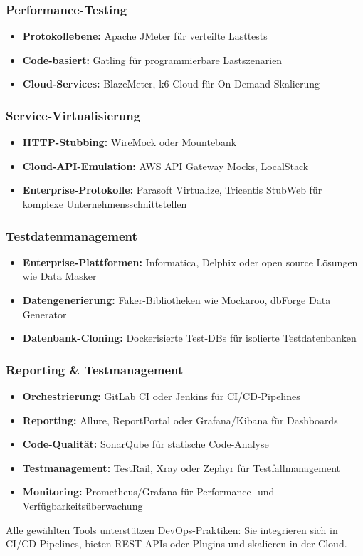 \subsubsection{Performance-Testing}
\begin{itemize}
    \item \textbf{Protokollebene:} Apache JMeter für verteilte Lasttests
    \item \textbf{Code-basiert:} Gatling für programmierbare Lastszenarien
    \item \textbf{Cloud-Services:} BlazeMeter, k6 Cloud für On-Demand-Skalierung
\end{itemize}
\subsubsection{Service-Virtualisierung}
\begin{itemize}
    \item \textbf{HTTP-Stubbing:} WireMock oder Mountebank
    \item \textbf{Cloud-API-Emulation:} AWS API Gateway Mocks, LocalStack
    \item \textbf{Enterprise-Protokolle:} Parasoft Virtualize, Tricentis StubWeb für komplexe Unternehmensschnittstellen
\end{itemize}
\subsubsection{Testdatenmanagement}
\begin{itemize}
    \item \textbf{Enterprise-Plattformen:} Informatica, Delphix oder open source Lösungen wie Data Masker
    \item \textbf{Datengenerierung:} Faker-Bibliotheken wie Mockaroo, dbForge Data Generator
    \item \textbf{Datenbank-Cloning:} Dockerisierte Test-DBs für isolierte Testdatenbanken
\end{itemize}
\subsubsection{Reporting \& Testmanagement}
\begin{itemize}
    \item \textbf{Orchestrierung:} GitLab CI oder Jenkins für CI/CD-Pipelines
    \item \textbf{Reporting:} Allure, ReportPortal oder Grafana/Kibana für Dashboards
    \item \textbf{Code-Qualität:} SonarQube für statische Code-Analyse
    \item \textbf{Testmanagement:} TestRail, Xray oder Zephyr für Testfallmanagement
    \item \textbf{Monitoring:} Prometheus/Grafana für Performance- und Verfügbarkeitsüberwachung
\end{itemize}
Alle gewählten Tools unterstützen DevOps-Praktiken: Sie integrieren sich in CI/CD-Pipelines, bieten REST-APIs oder Plugins und skalieren in der Cloud.
